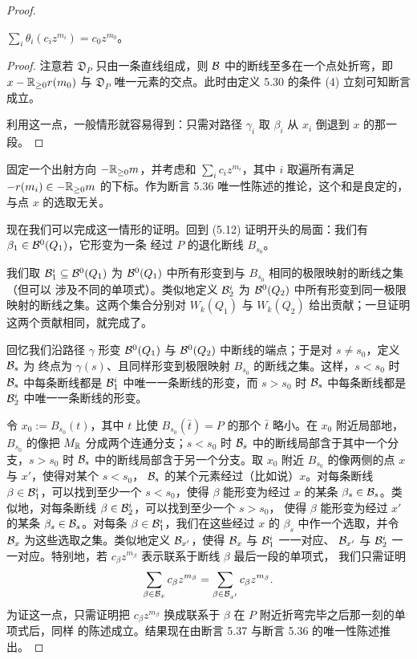 \begin{proof}
\begin{claim}
$\sum_i\theta_i(c_iz^{m_i}) = c_0z^{m_0}$。
\end{claim}

\begin{proof}
注意若 $\mathfrak D_P$ 只由一条直线组成，则 $\mathcal{B}$ 中的断线至多在一个点处折弯，即 $x-\mathbb{R}_{\ge0}r(m_0)$ 与
$\mathfrak D_P$ 唯一元素的交点。此时由定义 5.30 的条件 (4) 立刻可知断言成立。

利用这一点，一般情形就容易得到：只需对路径 $\gamma_i$ 取 $\beta_i$ 从 $x_i$ 倒退到 $x$ 的那一段。
\end{proof}

固定一个出射方向 $-\mathbb{R}_{\ge0}m$，并考虑和 $\sum_i c_iz^{m_i}$，其中 $i$ 取遍所有满足
$-r(m_i)\in-\mathbb{R}_{\ge0}m$ 的下标。作为断言 5.36 唯一性陈述的推论，这个和是良定的，与点 $x$ 的选取无关。

现在我们可以完成这一情形的证明。回到 (5.12) 证明开头的局面：我们有 $\beta_1\in\mathcal{B}^0(Q_1)$，它形变为一条
经过 $P$ 的退化断线 $B_{s_0}$。

我们取 $\mathcal{B}^i_1\subseteq\mathcal{B}^0(Q_1)$ 为 $\mathcal{B}^0(Q_1)$ 中所有形变到与 $B_{s_0}$ 相同的极限映射的断线之集（但可以
涉及不同的单项式）。类似地定义 $\mathcal{B}^i_2$ 为 $\mathcal{B}^0(Q_2)$ 中所有形变到同一极限映射的断线之集。这两个集合分别对
$W_k(Q_1)$ 与 $W_k(Q_2)$ 给出贡献；一旦证明这两个贡献相同，就完成了。

回忆我们沿路径 $\gamma$ 形变 $\mathcal{B}^0(Q_1)$ 与 $\mathcal{B}^0(Q_2)$ 中断线的端点；于是对 $s\ne s_0$，定义 $\mathcal{B}_s$ 为
终点为 $\gamma(s)$、且同样形变到极限映射 $B_{s_0}$ 的断线之集。这样，$s<s_0$ 时 $\mathcal{B}_s$ 中每条断线都是
$\mathcal{B}^i_1$ 中唯一一条断线的形变，而 $s>s_0$ 时 $\mathcal{B}_s$ 中每条断线都是 $\mathcal{B}^i_2$ 中唯一一条断线的形变。

令 $x_0 := B_{s_0}(t)$，其中 $t$ 比使 $B_{s_0}(\bar t) = P$ 的那个 $\bar t$ 略小。在 $x_0$ 附近局部地，
$B_{s_0}$ 的像把 $M_{\mathbb{R}}$ 分成两个连通分支；$s<s_0$ 时 $\mathcal{B}_s$ 中的断线局部含于其中一个分支，$s>s_0$ 时
$\mathcal{B}_s$ 中的断线局部含于另一个分支。取 $x_0$ 附近 $B_{s_0}$ 的像两侧的点 $x$ 与 $x'$，使得对某个 $s<s_0$，
$\mathcal{B}_s$ 的某个元素经过（比如说）$x$。对每条断线 $\beta\in\mathcal{B}^i_1$，可以找到至少一个 $s<s_0$，使得 $\beta$
能形变为经过 $x$ 的某条 $\beta_s\in\mathcal{B}_s$。类似地，对每条断线 $\beta\in\mathcal{B}^i_2$，可以找到至少一个 $s>s_0$，
使得 $\beta$ 能形变为经过 $x'$ 的某条 $\beta_s\in\mathcal{B}_s$。对每条 $\beta\in\mathcal{B}^i_1$，我们在这些经过 $x$ 的
$\beta_s$ 中作一个选取，并令 $\mathcal{B}_x$ 为这些选取之集。类似地定义 $\mathcal{B}_{x'}$，使得 $\mathcal{B}_x$ 与 $\mathcal{B}^i_1$ 一一对应、
$\mathcal{B}_{x'}$ 与 $\mathcal{B}^i_2$ 一一对应。特别地，若 $c_\beta z^{m_\beta}$ 表示联系于断线 $\beta$ 最后一段的单项式，
我们只需证明
\[
\sum_{\beta\in\mathcal{B}_x}c_\beta z^{m_\beta} = \sum_{\beta\in\mathcal{B}_{x'}}c_\beta z^{m_\beta}.
\]
为证这一点，只需证明把 $c_\beta z^{m_\beta}$ 换成联系于 $\beta$ 在 $P$ 附近折弯完毕之后那一刻的单项式后，同样
的陈述成立。结果现在由断言 5.37 与断言 5.36 的唯一性陈述推出。
\end{proof}


